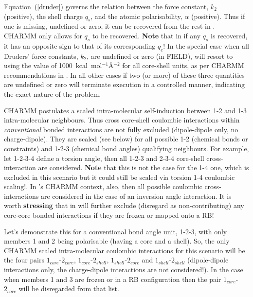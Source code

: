 Equation~(\ref{druder}) governs the relation between the force constant,
$k_{2}$ (positive), the shell charge $q_{s}$, and the atomic polarisability,
$\alpha$ (positive).  Thus if one is missing, undefined or zero, it can be
recovered from the rest in \D.  CHARMM only allows for $q_{s}$ to be
recovered.  {\bf Note} that in \D if any $q_{s}$ is recovered, it has an
opposite sign to that of its corresponding $q_{c}$!  In the special case
when all Druders' force constants, $k_{2}$, are undefined or zero (in FIELD),
\D will resort to using the value of 1000~kcal~mol$^{-1}$\AA$^{-2}$ for all
core-shell units, as per CHARMM recommendations in \cite{mackerell-16a}.
In all other cases if two (or more) of these three quantities are undefined
or zero \D will terminate execution in a controlled manner, indicating the
exact nature of the problem.

CHARMM postulates a scaled intra-molecular self-induction between 1-2
and 1-3 intra-molecular neighbours.  Thus cross core-shell coulombic
interactions within {\em conventional} bonded interactions are not fully
excluded (dipole-dipole only, no charge-dipole).  They are scaled
(see below) for all possible 1-2 (chemical bonds or constraints) and
1-2-3 (chemical bond angles) qualifying neighbours.  For example, let
1-2-3-4 define a torsion angle, then all 1-2-3 and 2-3-4 core-shell
cross-interaction are considered.  {\bf Note} that this is not the case
for the 1-4 one, which is excluded in this scenario but it could still
be scaled via torsion 1-4 coulombic scaling!.  In \D's CHARMM context,
also, then all possible coulombic cross-interactions are considered
in the case of an inversion angle interaction.  It is worth {\bf stressing}
that in \D will further exclude (disregard as non-contributing) any
core-core bonded interactions if they are frozen or mapped onto a RB!

Let's demonstrate this for a conventional bond angle unit, 1-2-3, with
only members 1 and 2 being polarisable (having a core and a shell).  So,
the only CHARMM scaled intra-molecular coulombic interactions for this
scenario will be the four pairs $1_{core}$-$2_{core}$, $1_{core}$-$2_{shell}$,
$1_{shell}$-$2_{core}$ and $1_{shell}$-$2_{shell}$ (dipole-dipole
interactions only, the charge-dipole interactions are not considered!).
In the case when members 1 and 3 are frozen or in a RB configuration
then the pair $1_{core}$-$2_{core}$ will be disregarded from that list.

